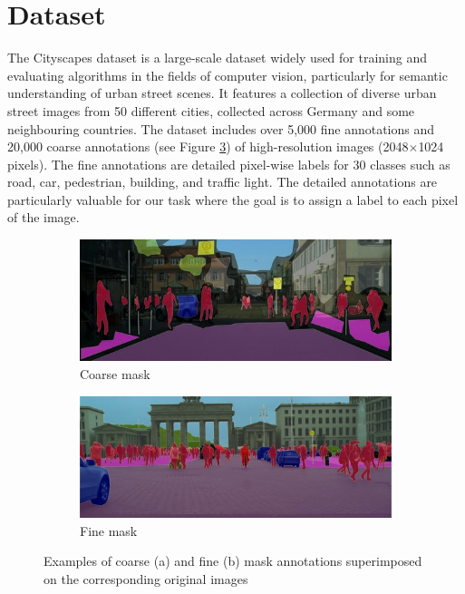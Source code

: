 \section{Dataset}

The Cityscapes dataset is a large-scale dataset widely used for training and evaluating algorithms in the fields of computer vision, particularly for semantic understanding of urban street scenes. It features a collection of diverse urban street images from 50 different cities, collected across Germany and some neighbouring countries. The dataset includes over 5,000 fine annotations and 20,000 coarse annotations (see Figure \ref{fig:cityscapes}) of high-resolution images (2048$\times$1024 pixels). The fine annotations are detailed pixel-wise labels for 30 classes such as road, car, pedestrian, building, and traffic light. The detailed annotations are particularly valuable for our task where the goal is to assign a label to each pixel of the image. 

\begin{figure}[ht]
    \centering
    \begin{subfigure}{0.45\textwidth}
        \centering
        \includegraphics[width=\linewidth]{coarse_example.jpg}
        \caption{Coarse mask}
        \label{fig:sub1}
    \end{subfigure}\hfill
    \begin{subfigure}{0.45\textwidth}
        \centering
        \includegraphics[width=\linewidth]{fine_example.jpg}
        \caption{Fine mask}
        \label{fig:sub2}
    \end{subfigure}
    \caption{Examples of coarse (a) and fine (b) mask annotations superimposed on the corresponding original images}
    \label{fig:cityscapes}
\end{figure}

